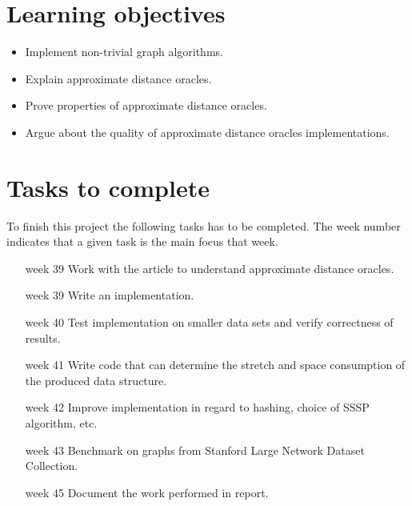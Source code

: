 \documentclass[10pt,a4paper,final,oneside,openany,article]{memoir}
\begin{document}
\chapter{Learning objectives}
\begin{itemize}
    \item Implement non-trivial graph algorithms.
    \item Explain approximate distance oracles.
    \item Prove properties of approximate distance oracles.
    \item Argue about the quality of approximate distance oracles implementations.
\end{itemize}

\chapter{Tasks to complete}
To finish this project the following tasks has to be completed. The week
number indicates that a given task is the main focus that week.

\begin{itemize}[leftmargin=2cm]
    \item[week 39] Work with the article to understand approximate distance oracles.
    \item[week 39] Write an implementation.
    \item[week 40] Test implementation on smaller data sets and verify correctness of results.
    \item[week 41] Write code that can determine the stretch and space consumption of the produced data structure.
    \item[week 42] Improve implementation in regard to hashing, choice of SSSP algorithm, etc.
    \item[week 43] Benchmark on graphs from Stanford Large Network Dataset Collection.
    \item[week 45] Document the work performed in report.
\end{itemize}

\printbibliography
\end{document}
